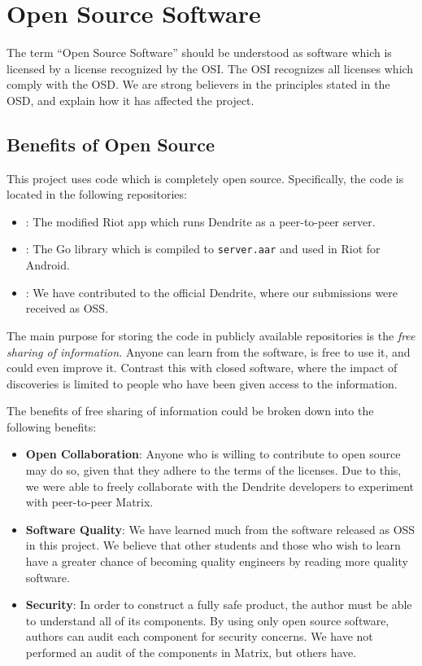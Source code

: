 \section{Open Source Software}\label{sec:open_source}
The term ``Open Source Software'' should be understood as software which is licensed by a license recognized by the \ac{OSI}\cite{open_source_initiative}.
The \ac{OSI} recognizes all licenses which comply with the \ac{OSD}\cite{open_source_definition}.
We are strong believers in the principles stated in the \ac{OSD}, and explain how it has affected the project.

\subsection{Benefits of Open Source}\label{subsec:benefits_of_open_source}
This project uses code which is completely open source.
Specifically, the code is located in the following repositories:
\begin{itemize}
	\item{
	      :
	      The modified Riot app which runs Dendrite as a peer-to-peer server.
	      }
	\item{
	      :
	      The Go library which is compiled to \texttt{server.aar} and used in Riot for Android.
	      }
	\item{
	      :
	      We have contributed to the official Dendrite, where our submissions were received as \ac{OSS}.
	      }
\end{itemize}

The main purpose for storing the code in publicly available repositories is the \textit{free sharing of information}.
Anyone can learn from the software, is free to use it, and could even improve it.
Contrast this with closed software, where the impact of discoveries is limited to people who have been given access to the information.

The benefits of free sharing of information could be broken down into the following benefits:
\begin{itemize}
	\item{
	      \textbf{Open Collaboration}:
	      Anyone who is willing to contribute to open source may do so, given that they adhere to the terms of the licenses.
	      Due to this, we were able to freely collaborate with the Dendrite developers to experiment with peer-to-peer Matrix.
	      }
	\item{
	      \textbf{Software Quality}:
	      We have learned much from the software released as \ac{OSS} in this project.
	      We believe that other students and those who wish to learn have a greater chance of becoming quality engineers by reading more quality software.
	      }
	\item{
	      \textbf{Security}:
	      In order to construct a fully safe product, the author must be able to understand all of its components.
	      By using only open source software, authors can audit each component for security concerns.
	      We have not performed an audit of the components in Matrix, but others have\cite{matrix_olm_cryptographic_review}.
	      }
\end{itemize}

